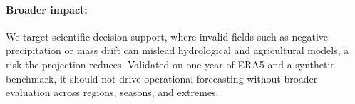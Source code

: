 \documentclass[letterpaper,withtimes]{easychair}
\begin{document}
\paragraph{Broader impact:}
We target scientific decision support, where invalid fields such as negative precipitation or mass drift can mislead hydrological and agricultural models, a risk the projection reduces. Validated on one year of ERA5 and a synthetic benchmark, it should not drive operational forecasting without broader evaluation across regions, seasons, and extremes.


{\footnotesize\linespread{0.93}\selectfont }
\end{document}
